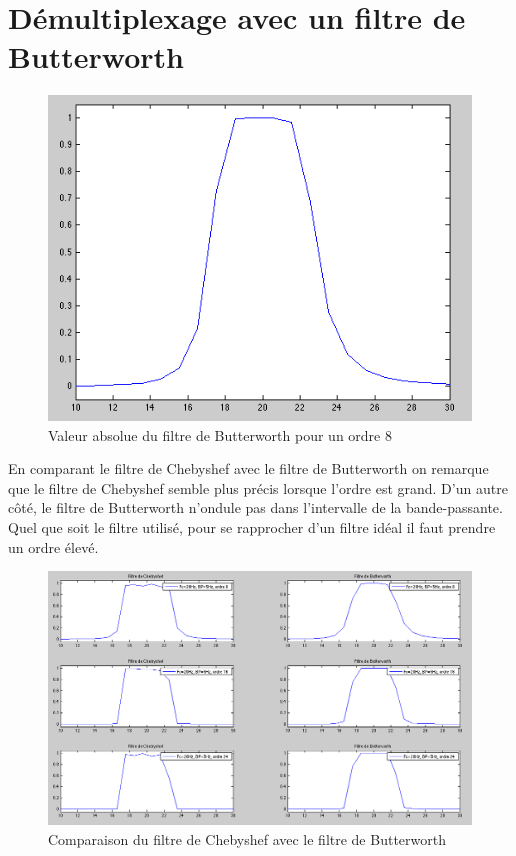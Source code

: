 \documentclass[a4paper, oneside]{report}
\begin{document}
 
  \chapter{D\'emultiplexage avec un filtre de Butterworth}
 
 \begin{figure}[h]
 \centering
 \includegraphics[scale=0.8]{images/butter.png}
 \caption{Valeur absolue du filtre de Butterworth pour un ordre 8}
 \end{figure}
  
 En comparant le filtre de Chebyshef avec le filtre de Butterworth on remarque que le filtre de Chebyshef semble plus pr\'ecis lorsque l'ordre est grand. D'un autre c\^ot\'e, le filtre de Butterworth n'ondule pas dans l'intervalle de la bande-passante.\\
 Quel que soit le filtre utilis\'e, pour se rapprocher d'un filtre id\'eal il faut prendre un ordre \'elev\'e.
 \newpage
  
 \begin{figure}[h]
 \centering
 \includegraphics[scale=0.45]{images/butt_cheb.png}
 \caption{Comparaison du filtre de Chebyshef avec le filtre de Butterworth}
 \end{figure}
\end{document}
